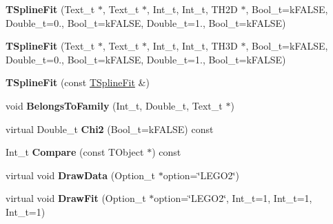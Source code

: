 \begin{DoxyCompactItemize}
\item 
\hypertarget{classTSplineFit_a588b2c3be05e32c03ce8396a35d57733}{{\bfseries T\-Spline\-Fit} (Text\-\_\-t $\ast$, Text\-\_\-t $\ast$, Int\-\_\-t, Int\-\_\-t, T\-H2\-D $\ast$, Bool\-\_\-t=k\-F\-A\-L\-S\-E, Double\-\_\-t=0., Bool\-\_\-t=k\-F\-A\-L\-S\-E, Double\-\_\-t=1., Bool\-\_\-t=k\-F\-A\-L\-S\-E)}\label{classTSplineFit_a588b2c3be05e32c03ce8396a35d57733}

\item 
\hypertarget{classTSplineFit_a7996e79008a2220578fcac0ef83435ea}{{\bfseries T\-Spline\-Fit} (Text\-\_\-t $\ast$, Text\-\_\-t $\ast$, Int\-\_\-t, Int\-\_\-t, T\-H3\-D $\ast$, Bool\-\_\-t=k\-F\-A\-L\-S\-E, Double\-\_\-t=0., Bool\-\_\-t=k\-F\-A\-L\-S\-E, Double\-\_\-t=1., Bool\-\_\-t=k\-F\-A\-L\-S\-E)}\label{classTSplineFit_a7996e79008a2220578fcac0ef83435ea}

\item 
\hypertarget{classTSplineFit_ae43b5fca75b0956a1267b375f3020d03}{{\bfseries T\-Spline\-Fit} (const \hyperlink{classTSplineFit}{T\-Spline\-Fit} \&)}\label{classTSplineFit_ae43b5fca75b0956a1267b375f3020d03}

\item 
\hypertarget{classTSplineFit_afd0d11e8340d8a1d7b70dc54ea982447}{void {\bfseries Belongs\-To\-Family} (Int\-\_\-t, Double\-\_\-t, Text\-\_\-t $\ast$)}\label{classTSplineFit_afd0d11e8340d8a1d7b70dc54ea982447}

\item 
\hypertarget{classTSplineFit_ac4c27000e1a5ac6c733393115de73f10}{virtual Double\-\_\-t {\bfseries Chi2} (Bool\-\_\-t=k\-F\-A\-L\-S\-E) const }\label{classTSplineFit_ac4c27000e1a5ac6c733393115de73f10}

\item 
\hypertarget{classTSplineFit_a149ca22416c3df776f38d6b37f191ac5}{Int\-\_\-t {\bfseries Compare} (const T\-Object $\ast$) const }\label{classTSplineFit_a149ca22416c3df776f38d6b37f191ac5}

\item 
\hypertarget{classTSplineFit_a2919b0a4eef386eeb6e542a7408e5c7f}{virtual void {\bfseries Draw\-Data} (Option\-\_\-t $\ast$option=\char`\"{}L\-E\-G\-O2\char`\"{})}\label{classTSplineFit_a2919b0a4eef386eeb6e542a7408e5c7f}

\item 
\hypertarget{classTSplineFit_a62c373358ad56ed8836252cf2e2a7239}{virtual void {\bfseries Draw\-Fit} (Option\-\_\-t $\ast$option=\char`\"{}L\-E\-G\-O2\char`\"{}, Int\-\_\-t=1, Int\-\_\-t=1, Int\-\_\-t=1)}\label{classTSplineFit_a62c373358ad56ed8836252cf2e2a7239}


\end{DoxyCompactItemize}
